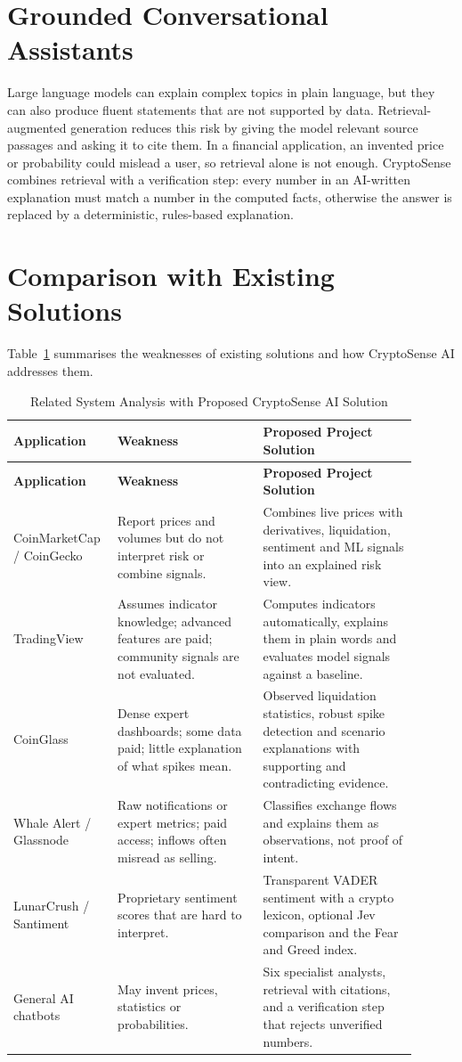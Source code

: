 \section{Grounded Conversational Assistants}
Large language models can explain complex topics in plain language, but they can also produce fluent statements that are not supported by data. Retrieval-augmented generation \cite{lewis2020rag} reduces this risk by giving the model relevant source passages and asking it to cite them. In a financial application, an invented price or probability could mislead a user, so retrieval alone is not enough. CryptoSense combines retrieval with a verification step: every number in an AI-written explanation must match a number in the computed facts, otherwise the answer is replaced by a deterministic, rules-based explanation.

\section{Comparison with Existing Solutions}
Table~\ref{tab:related} summarises the weaknesses of existing solutions and how CryptoSense AI addresses them.

{\renewcommand{\arraystretch}{1.3}
\begin{longtable}{|p{0.2\linewidth}|p{0.34\linewidth}|p{0.36\linewidth}|}
\caption{Related System Analysis with Proposed CryptoSense AI Solution}\label{tab:related}\\\hline
\textbf{Application} & \textbf{Weakness} & \textbf{Proposed Project Solution}\\\hline\endfirsthead
\hline\textbf{Application} & \textbf{Weakness} & \textbf{Proposed Project Solution}\\\hline\endhead
CoinMarketCap / CoinGecko & Report prices and volumes but do not interpret risk or combine signals. & Combines live prices with derivatives, liquidation, sentiment and ML signals into an explained risk view.\\\hline
TradingView & Assumes indicator knowledge; advanced features are paid; community signals are not evaluated. & Computes indicators automatically, explains them in plain words and evaluates model signals against a baseline.\\\hline
CoinGlass & Dense expert dashboards; some data paid; little explanation of what spikes mean. & Observed liquidation statistics, robust spike detection and scenario explanations with supporting and contradicting evidence.\\\hline
Whale Alert / Glassnode & Raw notifications or expert metrics; paid access; inflows often misread as selling. & Classifies exchange flows and explains them as observations, not proof of intent.\\\hline
LunarCrush / Santiment & Proprietary sentiment scores that are hard to interpret. & Transparent VADER sentiment with a crypto lexicon, optional Jev comparison and the Fear and Greed index.\\\hline
General AI chatbots & May invent prices, statistics or probabilities. & Six specialist analysts, retrieval with citations, and a verification step that rejects unverified numbers.\\\hline
\end{longtable}}

